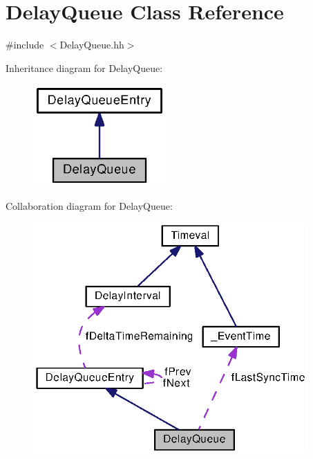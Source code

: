 \section{Delay\+Queue Class Reference}
\label{classDelayQueue}


{\ttfamily \#include $<$Delay\+Queue.\+hh$>$}



Inheritance diagram for Delay\+Queue\+:
\nopagebreak
\begin{figure}[H]
\begin{center}
\leavevmode
\includegraphics[width=144pt]{classDelayQueue__inherit__graph}
\end{center}
\end{figure}


Collaboration diagram for Delay\+Queue\+:
\nopagebreak
\begin{figure}[H]
\begin{center}
\leavevmode
\includegraphics[width=298pt]{classDelayQueue__coll__graph}
\end{center}
\end{figure}
